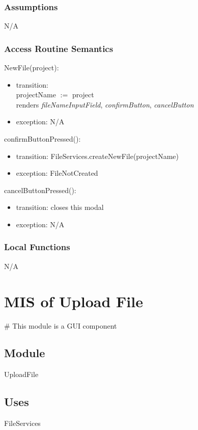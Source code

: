 \documentclass[12pt, titlepage]{article}
\begin{document}
	\subsubsection{Assumptions}
	N/A
	
	\subsubsection{Access Routine Semantics}
	
	\noindent NewFile(project):
	\begin{itemize}
		\item transition:\\
		projectName $:=$ project \\
		renders \textit{fileNameInputField}, \textit{confirmButton}, \textit{cancelButton}
		\item exception: N/A
	\end{itemize}
	
	\noindent confirmButtonPressed():
	\begin{itemize}
		\item transition: FileServices.createNewFile(projectName)\\
		\item exception: FileNotCreated
	\end{itemize}
	
	\noindent cancelButtonPressed():
	\begin{itemize}
		\item transition: closes this modal
		\item exception: N/A
	\end{itemize}
	
	\subsubsection{Local Functions}
	
	N/A
	
	\newpage
	
	\section{MIS of Upload File} \label{Module} 
	\# This module is a GUI component
	\subsection{Module}
	
	UploadFile
	
	\subsection{Uses}
	FileServices
	
\end{document}
